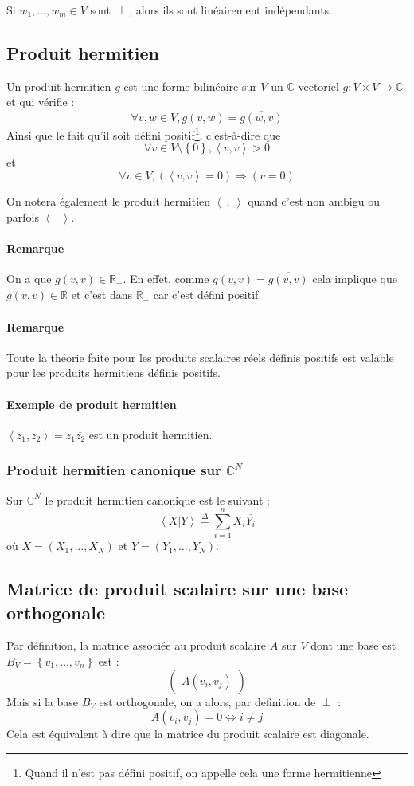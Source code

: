 \documentclass[a4paper,10pt]{article}
\newcommand{\ap}{ \rightarrow} %
\newcommand{\grp}[1]{\left\langle #1 \right\rangle} %
\newcommand{\set}[1]{\left\lbrace #1 \right\rbrace } %
\newcommand{\so}{\Rightarrow} %
\newcommand{\ioi}{\Leftrightarrow} %
\newcommand{\RR}{\mathbb{R}} %
\newcommand{\CC}{\mathbb{C}} %
\begin{document}
    Si $w_1, \hdots, w_m \in V$ sont $\perp$, alors ils sont linéairement indépendants.

  \subsection{Produit hermitien}
   Un produit hermitien $g$ est une forme bilinéaire sur $V$ un $\CC$-vectoriel $g:V \times V \ap \CC$ et qui vérifie :
    $$\forall v,w \in V, g(v,w)=\overline{g(w,v)}$$
   Ainsi que le fait qu'il soit défini positif\footnote{Quand il n'est pas défini positif, on appelle cela une forme hermitienne}, c'est-à-dire que
    $$\forall v \in V\setminus \set{0}, \grp{v,v} > 0$$
   et
    $$\forall v \in V, (\grp{v,v}=0) \so (v=0)$$

   On notera également le produit hermitien $\grp{~,\:}$ quand c'est non ambigu ou parfois $\grp{~|\:}$.

   \paragraph{Remarque} On a que $g(v,v) \in \RR_+$. En effet, comme $g(v,v)=\overline{g(v,v)}$ cela implique que $g(v,v)\in \RR$ et c'est dans $\RR_+$ car c'est défini positif.

   \paragraph{Remarque} Toute la théorie faite pour les produits scalaires réels définis positifs est valable pour les produits hermitiens définis positifs.

   \paragraph{Exemple de produit hermitien} $\grp{z_1,z_2}=z_1\overline{z_2}$ est un produit hermitien.

   \subsubsection{Produit hermitien canonique sur $\CC^N$}
    Sur $\CC^N$ le produit hermitien canonique est le suivant :
     $$\grp{X | Y} \overset{\Delta}{=} \sum^n_{i=1}X_i \overline{Y_i}$$
     où $X=(X_1,\hdots,X_N)$ et $Y=(Y_1,\hdots,Y_N)$.

  \subsection{Matrice de produit scalaire sur une base orthogonale}
   Par définition, la matrice associée au produit scalaire $A$ sur $V$ dont une base est $B_V=\set{v_1,\hdots,v_n}$ est :
    $$
    \begin{pmatrix}
     A(v_i,v_j)
    \end{pmatrix}
    $$
   Mais si la base $B_V$ est orthogonale, on a alors, par definition de $\perp$ :
    $$A(v_i,v_j)=0 \ioi i\neq j$$
   Cela est équivalent à dire que la matrice du produit scalaire est diagonale.
\end{document}
